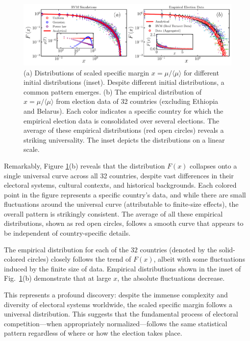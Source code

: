 \begin{figure}[H]
    \centering
    \includegraphics[width=\textwidth]{chapters/chapter4/fig_3.pdf}
    \caption{(a) Distributions of scaled specific margin $x=\mu/\langle\mu\rangle$ for different initial distributions (inset). Despite different initial distributions, a common pattern emerges. (b) The empirical distribution of $x=\mu/\langle \mu \rangle$ from election data of 32 countries (excluding Ethiopia and Belarus). Each color indicates a specific country for which the empirical election data is consolidated over several elections. The average of these empirical distributions (red open circles) reveals a striking universality. The inset depicts the distributions on a linear scale.}
    \label{fig:universality}
\end{figure}

Remarkably, Figure \ref{fig:universality}(b) reveals that the distribution $F(x)$ collapses onto a single universal curve across all 32 countries, despite vast differences in their electoral systems, cultural contexts, and historical backgrounds. Each colored point in the figure represents a specific country's data, and while there are small fluctuations around the universal curve (attributable to finite-size effects), the overall pattern is strikingly consistent. The average of all these empirical distributions, shown as red open circles, follows a smooth curve that appears to be independent of country-specific details.

The empirical distribution for each of the $32$ countries (denoted by the solid-colored circles) closely follows the trend of $F(x)$, albeit with some fluctuations induced by the finite size of data. Empirical distributions shown in the inset of Fig.~\ref{fig:universality}(b) demonstrate that at large $x$, the absolute fluctuations decrease. 

This represents a profound discovery: despite the immense complexity and diversity of electoral systems worldwide, the scaled specific margin follows a universal distribution. This suggests that the fundamental process of electoral competition—when appropriately normalized—follows the same statistical pattern regardless of where or how the election takes place.

